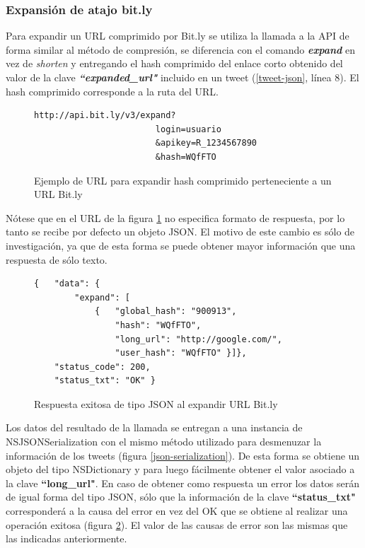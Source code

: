 		\subsubsection{Expansión de atajo bit.ly}
Para expandir un URL comprimido por Bit.ly se utiliza la llamada a la API de forma similar al método de compresión, se diferencia con el comando \textit{\textbf{expand}} en vez de \textit{shorten} y entregando el hash comprimido del enlace corto obtenido del valor de la clave \textit{\textbf{\textquotedblleft expanded\_url"}} incluido en un tweet (\ref{tweet-json}, línea 8). El hash comprimido corresponde a la ruta del URL.

\begin{figure}[H]
	\centering
\begin{lstlisting}
http://api.bit.ly/v3/expand?
						login=usuario
						&apikey=R_1234567890
						&hash=WQfFTO
\end{lstlisting}
	\caption{Ejemplo de URL para expandir hash comprimido perteneciente a un URL Bit.ly}
	\label{bitly-expand}
\end{figure}	
Nótese que en el URL de la figura \ref{bitly-expand} no especifica formato de respuesta, por lo tanto se recibe por defecto un objeto JSON. El motivo de este cambio es sólo de investigación, ya que de esta forma se puede obtener mayor información que una respuesta de sólo texto.

\begin{figure}[H]
	\centering
\begin{lstlisting}
{   "data": {
        "expand": [
            { 	"global_hash": "900913",
                "hash": "WQfFTO",
                "long_url": "http://google.com/",
                "user_hash": "WQfFTO" }]},
    "status_code": 200,
    "status_txt": "OK" }
\end{lstlisting}
	\caption{Respuesta exitosa de tipo JSON al expandir URL Bit.ly}
	\label{bitly-json-response}
\end{figure}	
Los datos del resultado de la llamada se entregan a una instancia de NSJSONSerialization con el mismo método utilizado para desmenuzar la información de los tweets (figura \ref{json-serialization}). De esta forma se obtiene un objeto del tipo NSDictionary y para luego fácilmente obtener el valor asociado a la clave \textbf{\textquotedblleft long\_url"}.
En caso de obtener como respuesta un error los datos serán de igual forma del tipo JSON, sólo que la información de la clave \textbf{\textquotedblleft status\_txt"} corresponderá a la causa del error en vez del OK que se obtiene al realizar una operación exitosa (figura \ref{bitly-json-response}). El valor de las causas de error son las mismas que las indicadas anteriormente.


